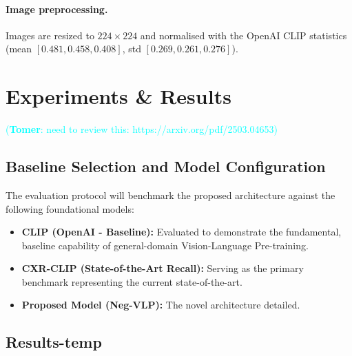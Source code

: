 \documentclass[10pt,twocolumn,letterpaper]{article}
\newcommand\te[1]{\textcolor{cyan}{(\textbf{Tomer}: #1)}}
\begin{document}
\paragraph{Image preprocessing.}
Images are resized to $224\times224$ and normalised with the OpenAI CLIP statistics (mean $[0.481, 0.458, 0.408]$, std $[0.269, 0.261, 0.276]$).

\section{Experiments \& Results}

\te{need to review this: https://arxiv.org/pdf/2503.04653}

\subsection{Baseline Selection and Model Configuration}
The evaluation protocol will benchmark the proposed architecture against the following foundational models:
\begin{itemize}
    \item \textbf{CLIP (OpenAI - Baseline):} Evaluated to demonstrate the fundamental, baseline capability of general-domain Vision-Language Pre-training.
    \item \textbf{CXR-CLIP (State-of-the-Art Recall):} Serving as the primary benchmark representing the current state-of-the-art.
    \item \textbf{Proposed Model (Neg-VLP):} The novel architecture detailed.
\end{itemize}

\subsection{Results-temp}

\begin{table}[h]
\centering
\caption{Macro-averaged metrics on single label queries.}
\label{tab:single_label_queries}
\end{table}
\end{document}
